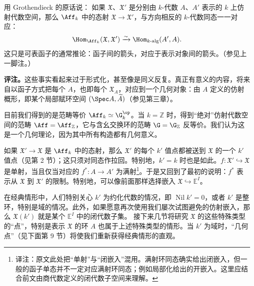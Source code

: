 用 Grothendieck 的原话说：
如果 $\mathfrak X$、$\mathfrak X'$ 是分别由 $k$-代数 $A$、$A'$ 表示的 $k$ 上仿射代数空间，那么 $\Aff_k$ 中的态射 $\mathfrak X\to\mathfrak X'$，与方向相反的 $k$-代数同态一一对应：
\[
\Hom_{\Aff_k}(\mathfrak X,\mathfrak X')\xrightarrow{\sim}\Hom_{k\text{-alg}}(A',A).
\]
这只是可表函子的通常推论：函子间的箭头，对应于表示对象间的箭头。（参见上一脚注。）

\textbf{评注。}这些事实看起来过于形式化，甚至像是同义反复。真正有意义的内容，将来自以函子方式把每个 $A$，也即每个 $\mathfrak X_A$，对应到一个几何对象：由 $A$ 定义的仿射概形，即某个局部赋环空间 $(\Spec A,\widetilde A)$（参见第三章）。

目前我们得到的是范畴等价 $\Aff_k\simeq\G_k^{\op}$。当 $k=\mathbb Z$ 时，得到“绝对”仿射代数空间的范畴 $\Aff=\Aff_{\mathbb Z}$，它与含幺交换环的范畴 $\G=\G_{\mathbb Z}$ 反等价。我们认为这是一个几何理论，因为其中所有构造都有几何意义。

如果 $\mathfrak X'\to\mathfrak X$ 是 $\Aff_k$ 中的态射，那么 $\mathfrak X'$ 的每个 $k'$ 值点都被送到 $\mathfrak X$ 的一个 $k'$ 值点（见第 2 节）；这只须对同态作拉回。特别地，$k'=k$ 时也是如此。$f\colon\mathfrak X'\hookrightarrow\mathfrak X$ 是单射，当且仅当对应的 $f^*\colon A\to A'$ 为满射\footnote{译注：原文此处把“单射”与“闭嵌入”混用。满射环同态确实给出闭嵌入，但一般的函子单态并不一定对应满射环同态；例如局部化给出的开嵌入。这里应结合前文由商代数定义的闭代数子空间来理解。}。于是又回到了最初的说明：$f^*$ 表示从 $\mathfrak X$ 到 $\mathfrak X'$ 的限制。特别地，可以像前面那样选择嵌入 $\mathfrak X\hookrightarrow\mathbb E^I$。

在经典情形中，人们特别关心 $k'$ 为约化代数的情况，即 $\operatorname{Nil}k'=0$，或者 $k'$ 是整环，特别是域的情况。此外，如果愿意再次使用我们屡次试图避免的仿射嵌入，那么 $\mathfrak X(k')$ 就是某个 $\mathbb E^I$ 中的闭代数子集。
接下来几节将研究 $\mathfrak X$ 的这些特殊类型的“点”，特别是表示 $\mathfrak X$ 的环 $A$ 也属于上述特殊类型的情形。当 $k'$ 为域时，“几何点”（见下面第 9 节）将使我们重新获得经典情形的直观。

